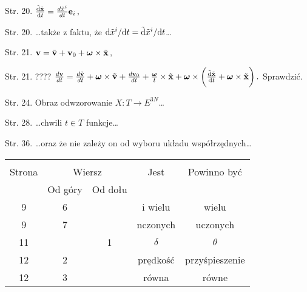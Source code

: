 \documentclass[a4paper,11pt]{article}
\begin{document}
Str. 20.
$\frac{ \tilde{ \mathrm{d} } \tilde{ \mathbf{x} } }{ \mathrm{d} t }
= \frac{ d\tilde{ x }^{ i } }{ dt } \mathbf{e}_{ i } \, ,$

Str. 20. \ldots także z faktu, że
$\mathrm{d} \tilde{ x }^{ i } / \mathrm{d} t = \tilde{ \mathrm{d} } \tilde{ x
}^{ i } / \mathrm{d} t$\ldots

Str. 21.
$\mathbf{v} = \tilde{ \mathbf{v} } + \mathbf{v}_{ 0 } +
\boldsymbol{\omega} \times \tilde{ \mathbf{x} } \, ,$

Str. 21. ????
$\frac{ d\mathbf{v} }{ dt } = \frac{ d\tilde{ \mathbf{v} } }{ dt }
+ \boldsymbol{\omega} \times \tilde{ \mathbf{v} } + \frac{
  d\mathbf{v}_{ 0 } }{ dt } + \frac{ \boldsymbol{\omega} }{ t }
\times \tilde{ \mathbf{x} } + \boldsymbol{\omega}  \times \bigg(
\frac{ \tilde{ \mathrm{d} } \tilde{ \mathbf{x} } }{ \mathrm{d} t } +
\boldsymbol{\omega} \times \tilde{ \mathbf{x} } \bigg) \, .$
Sprawdzić.

Str. 24. Obraz odwzorowanie
$X : T \rightarrow E^{ 3N }$\ldots

Str. 28. \ldots chwili $t \in T$ funkcje\ldots

Str. 36. \ldots oraz że nie zależy on od wyboru układu
współrzędnych\ldots


\vspace{\spaceTwo}










\newpage






\begin{center}

  \begin{tabular}{|c|c|c|c|c|}
    \hline
    & \multicolumn{2}{c|}{} & & \\
    Strona & \multicolumn{2}{c|}{Wiersz}
                            & Jest & Powinno być \\ \cline{2-3}
    & Od góry & Od dołu & & \\
    \hline
    9   &  6 & & i wielu & wielu \\
    9   &  7 & & nczonych & uczonych \\
    11  & &  1 & $\delta$ & $\theta$ \\
    12  &  2 & & prędkość & przyśpieszenie \\
    12  &  3 & & równa & równe \\
    \hline
  \end{tabular}

\end{center}
\end{document}
